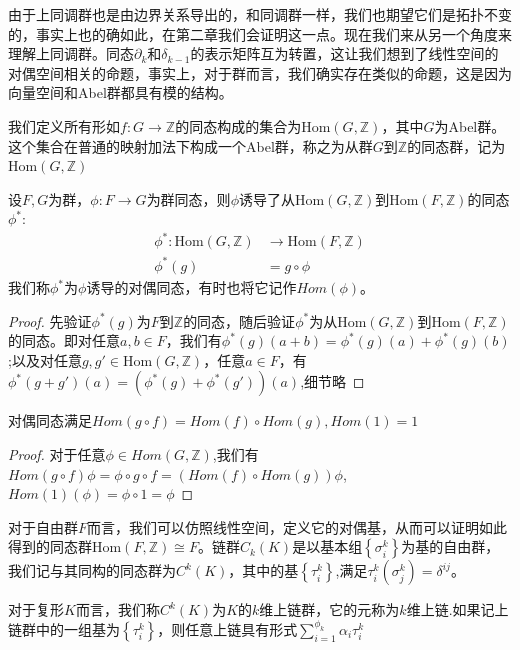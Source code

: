 由于上同调群也是由边界关系导出的，和同调群一样，我们也期望它们是拓扑不变的，事实上也的确如此，在第二章我们会证明这一点。现在我们来从另一个角度来理解上同调群。同态$\partial_{k}$和$\delta_{k-1}$的表示矩阵互为转置，这让我们想到了线性空间的对偶空间相关的命题，事实上，对于群而言，我们确实存在类似的命题，这是因为向量空间和Abel群都具有模的结构。
\begin{definition}
我们定义所有形如$f:G\rightarrow \mathbb{Z}$的同态构成的集合为$\text{Hom}(G,\mathbb{Z})$，其中$G$为Abel群。这个集合在普通的映射加法下构成一个Abel群，称之为从群$G$到$\mathbb{Z}$的同态群，记为$\text{Hom}(G,\mathbb{Z})$
\end{definition}
\begin{proposition}\label{pro1035}
设$F,G$为群，$\phi:F\rightarrow G$为群同态，则$\phi$诱导了从$\text{Hom}(G,\mathbb{Z})$到$\text{Hom}(F,\mathbb{Z})$的同态$\phi^{*}$:
\begin{equation*}
    \begin{aligned}
        \phi^{*}:\text{Hom}(G,\mathbb{Z})&\rightarrow\text{Hom}(F,\mathbb{Z})\\
        \phi^{*}(g)&=g\circ \phi
    \end{aligned}
\end{equation*}
我们称$\phi^{*}$为$\phi$诱导的对偶同态，有时也将它记作$Hom(\phi)$。
\end{proposition}
\begin{proof}
先验证$\phi^{*}(g)$为$F$到$\mathbb{Z}$的同态，随后验证$\phi^{*}$为从$\text{Hom}(G,\mathbb{Z})$到$\text{Hom}(F,\mathbb{Z})$的同态。即对任意$a,b\in F$，我们有$\phi^{*}(g)(a+b)=\phi^{*}(g)(a)+\phi^{*}(g)(b)$;以及对任意$g,g'\in\text{Hom}(G,\mathbb{Z})$，任意$a\in F$，有$\phi^{*}(g+g')(a)=(\phi^{*}(g)+\phi^{*}(g'))(a)$,细节略
\end{proof}
\begin{corollary}\label{pro1049}
对偶同态满足$Hom(g\circ f)=Hom(f)\circ Hom(g),Hom(1)=1$
\end{corollary}
\begin{proof}
对于任意$\phi\in Hom(G,\mathbb{Z})$,我们有$Hom(g\circ f)\phi=\phi\circ g\circ f=(Hom(f)\circ Hom(g))\phi$,$Hom(1)(\phi)=\phi\circ 1=\phi$
\end{proof}
对于自由群$F$而言，我们可以仿照线性空间，定义它的对偶基，从而可以证明如此得到的同态群$\text{Hom}(F,\mathbb{Z})\cong F$。链群$C_{k}(K)$是以基本组$\left\{\sigma^{k}_{i}\right\}$为基的自由群，我们记与其同构的同态群为$C^{k}(K)$，其中的基$\left\{\tau^{k}_{i}\right\}$,满足$\tau^{k}_{i}(\sigma^{k}_{j})=\delta^{ij}$。
\begin{definition}
对于复形$K$而言，我们称$C^{k}(K)$为$K$的$k$维上链群，它的元称为$k$维上链.如果记上链群中的一组基为$\left\{\tau^{k}_{i}\right\}$，则任意上链具有形式$\sum\limits_{i=1}^{\phi_{k}}\alpha_{i}\tau^{k}_{i}$
\end{definition}
